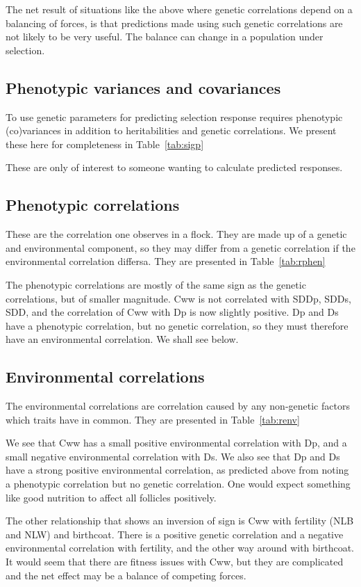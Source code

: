 \documentclass[titlepage]{article}  %
\begin{document}
The net result of situations like the above where genetic correlations depend on a balancing of forces, is that predictions made using such genetic correlations are not likely to be very useful. The balance can change in a population under selection.

\subsection{Phenotypic variances and covariances}
To use genetic parameters for predicting selection response requires phenotypic (co)variances in addition to heritabilities and genetic correlations. We present these here for completeness in Table~\ref{tab:sigp}

These are only of interest to someone wanting to calculate predicted responses.

\subsection{Phenotypic correlations}
These are the correlation one observes in a flock. They are made up of a genetic and environmental component, so they may differ from a genetic correlation if the environmental correlation differsa. They are presented in Table~\ref{tab:rphen}

The phenotypic correlations are mostly of the same sign as the genetic correlations, but of smaller magnitude. Cww is not correlated with SDDp, SDDs, SDD, and the  correlation of Cww with Dp is now slightly positive. Dp and Ds have a phenotypic correlation, but no genetic correlation, so they must therefore have an environmental correlation. We shall see below.
 
\subsection{Environmental correlations}
The environmental correlations are correlation caused by any non-genetic factors which traits have in common. They are presented in Table~\ref{tab:renv}

We see that Cww has a small positive environmental correlation with Dp, and a small negative environmental correlation with Ds.  We also see that Dp and Ds have a strong positive environmental correlation, as predicted above from noting a phenotypic correlation but no genetic correlation.  One would expect something like good nutrition to affect all follicles positively. 

The other relationship that shows an inversion of sign is Cww with fertility (NLB and NLW) and birthcoat. There is a positive genetic correlation and a negative environmental correlation with fertility, and the other way around with birthcoat. It would seem that there are fitness issues with Cww, but they are complicated and the net effect may be a balance of competing forces.
\end{document}
